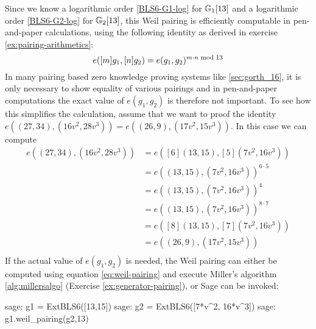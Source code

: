 Since we know a logarithmic order \ref{BLS6-G1-log} for $\mathbb{G}_1[13]$  and a logarithmic order \ref{BLS6-G2-log} for $\mathbb{G}_2[13]$, this Weil pairing is efficiently computable in pen-and-paper calculations, using the following identity as derived in exercise \ref{ex:pairing-arithmetics}:  
\begin{equation}\label{eq:bilinearityBLS6}
e([m]g_{1},[n]g_{2}) = 
e(g_{1},g_{2})^{m\cdot n \text{ mod } 13}
\end{equation}
In many pairing based zero knowledge proving systems like \ref{sec:gorth_16}, it is only necessary to show equality of various pairings and in pen-and-paper computations the exact value of $e(g_{1},g_{2})$ is therefore not important. To see how this simplifies the calculation, assume that we want to proof the identity $e((27,34),(16v^2,28v^3))=e((26,9),(17v^2,15v^3))$. In this case we can compute
\begin{align*}
e((27,34),(16v^2,28v^3)) 
               & = e([6](13,15),[5](7v^2,16v^3))\\
               & = e((13,15),(7v^2,16v^3))^{6\cdot 5}\\
               & = e((13,15),(7v^2,16v^3))^{4}\\
               & = e((13,15),(7v^2,16v^3))^{8\cdot 7}\\
               & = e([8](13,15),[7](7v^2,16v^3))\\
               & = e((26,9),(17v^2,15v^3))\\
\end{align*}
If the actual value of $e(g_{1},g_{2})$ is needed, the Weil pairing can either  be computed using equation \ref{eq:weil-pairing} and execute Miller's algorithm \ref{alg:millersalgo} (Exercise \ref{ex:generator-pairing}), or Sage can be invoked:  
\begin{sagecommandline}
sage: g1 = ExtBLS6([13,15])
sage: g2 = ExtBLS6([7*v^2, 16*v^3])
sage: g1.weil_pairing(g2,13)
\end{sagecommandline}

